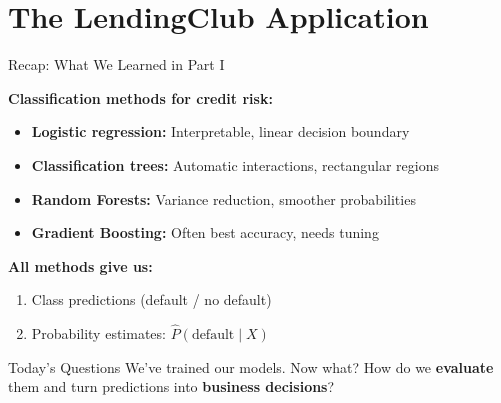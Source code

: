 \documentclass[10pt]{beamer}
\newcommand{\highlight}[1]{\textcolor{AccentOrange}{\textbf{#1}}}
\begin{document}
\section{The LendingClub Application}

\begin{frame}{Recap: What We Learned in Part I}

  \textbf{Classification methods for credit risk:}
  \begin{itemize}
    \item \textbf{Logistic regression:} Interpretable, linear decision boundary
    \item \textbf{Classification trees:} Automatic interactions, rectangular regions
    \item \textbf{Random Forests:} Variance reduction, smoother probabilities
    \item \textbf{Gradient Boosting:} Often best accuracy, needs tuning
  \end{itemize}

  \vspace{1em}
  \textbf{All methods give us:}
  \begin{enumerate}
    \item Class predictions (default / no default)
    \item Probability estimates: $\widehat{P}(\text{default} \mid X)$
  \end{enumerate}

  \vspace{1em}
  \begin{block}{Today's Questions}
    We've trained our models. Now what? How do we \highlight{evaluate} them and turn predictions into \highlight{business decisions}?
  \end{block}
\end{frame}

\end{document}
